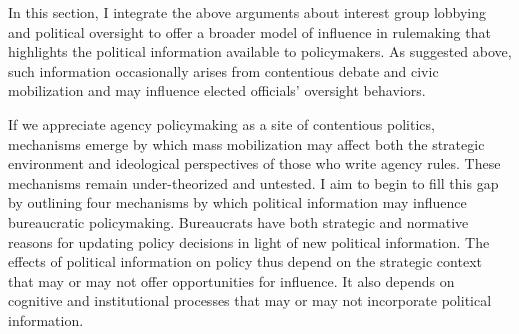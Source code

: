 In this section, I integrate the above arguments about interest group lobbying and political oversight to offer a broader model of influence in rulemaking that highlights the political information available to policymakers. As suggested above, such information occasionally arises from contentious debate and civic mobilization and may influence elected officials' oversight behaviors. %

If we appreciate agency policymaking as a site of contentious politics, mechanisms emerge by which mass mobilization may affect both the strategic environment and ideological perspectives of those who write agency rules. These mechanisms remain under-theorized and untested. I aim to begin to fill this gap by outlining four mechanisms by which political information may influence bureaucratic policymaking. 
Bureaucrats have both strategic and normative reasons for updating policy decisions in light of new political information. The effects of political information on policy thus depend on the strategic context that may or may not offer opportunities for influence. It also depends on cognitive and institutional processes that may or may not incorporate political information.



